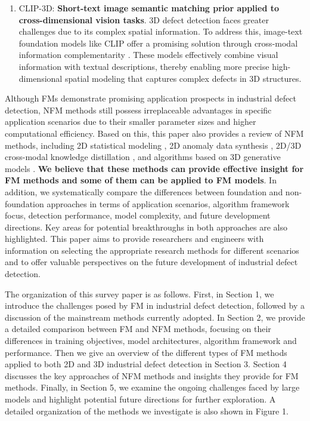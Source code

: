 \documentclass[journal,comsoc]{IEEEtran}
\begin{document}
\begin{enumerate}
    \item CLIP-3D: \textbf{Short-text image semantic matching prior applied to cross-dimensional vision tasks}. 3D defect detection faces greater challenges due to its complex spatial information. To address this, image-text foundation models like CLIP offer a promising solution through cross-modal information complementarity \cite{zuo2024clip3d,zhou2024pointad,wang2024m3dm}. These models effectively combine visual information with textual descriptions, thereby enabling more precise high-dimensional spatial modeling that captures complex defects in 3D structures.
\end{enumerate}



Although FMs demonstrate promising application prospects in industrial defect detection, NFM methods still possess irreplaceable advantages in specific application scenarios due to their smaller parameter sizes and higher computational efficiency. Based on this, this paper also provides a review of NFM methods, including 2D statistical modeling \cite{zhang2024sofs,bae2023pni,lyu2024reb,yao2023bgad,qian2024friend}, 2D anomaly data synthesis \cite{chen2025glass,li2024adabldm,zhang2024realnet,jiang2024cagen,hu2024anomalyxfusion,hu2024anomalydiffusion,duan2023dfmgan,zhang2023destseg,qin2024cutswap,lin2024split,bai2024dfd,chen2024pbas}, 2D/3D cross-modal knowledge distillation \cite{chu2023shape,cao2024cpmf,horwitz2023back,fuvcka2025transfusion,zavrtanik20243dsr,wang2024m3dm,rudolph2023ast}, and algorithms based on 3D generative models \cite{zhou2025r3d,zhao2024pointcore,zuo2024clip3d,liu2024uni,zhu2024group3ad}. \textbf{We believe that these methods can provide effective insight for FM methods and some of them can be applied to FM models}. In addition, we systematically compare the differences between foundation and non-foundation approaches in terms of application scenarios, algorithm framework focus, detection performance, model complexity, and future development directions. Key areas for potential breakthroughs in both approaches are also highlighted. This paper aims to provide researchers and engineers with information on selecting the appropriate research methods for different scenarios and to offer valuable perspectives on the future development of industrial defect detection.

The organization of this survey paper is as follows. First, in Section 1, we introduce the challenges posed by FM in industrial defect detection, followed by a discussion of the mainstream methods currently adopted. In Section 2, we provide a detailed comparison between FM and NFM methods, focusing on their differences in training objectives, model architectures, algorithm framework and performance. Then we give an overview of the different types of FM methods applied to both 2D and 3D industrial defect detection in Section 3. Section 4 discusses the key approaches of NFM methods and insights they provide for FM methods. Finally, in Section 5, we examine the ongoing challenges faced by large models and highlight potential future directions for further exploration. A detailed organization of the methods we investigate is also shown in Figure 1.
\end{document}
